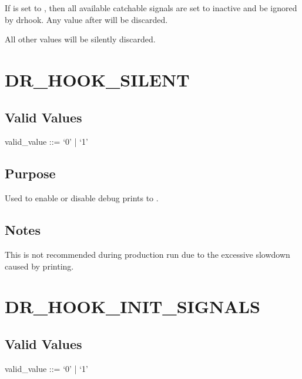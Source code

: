 \documentclass[letterpaper,10pt,english]{sphinxmanual}
\begin{document}
\sphinxAtStartPar
If  is set to , then all available catchable signals are set to inactive and be ignored by drhook. Any value after  will be discarded.

\sphinxAtStartPar
All other values will be silently discarded.


\section{DR\_HOOK\_SILENT}
\label{\detokenize{flag/flag:dr-hook-silent}}\label{\detokenize{flag/flag:id23}}

\subsection{Valid Values}
\label{\detokenize{flag/flag:id24}}
\begin{DUlineblock}{0em}
\item[] valid\_value ::= ‘0’ | ‘1’
\end{DUlineblock}


\subsection{Purpose}
\label{\detokenize{flag/flag:id25}}
\sphinxAtStartPar
Used to enable or disable debug prints to .


\subsection{Notes}
\label{\detokenize{flag/flag:id26}}
\sphinxAtStartPar
This is not recommended during production run due to the excessive slowdown caused by printing.


\section{DR\_HOOK\_INIT\_SIGNALS}
\label{\detokenize{flag/flag:dr-hook-init-signals}}\label{\detokenize{flag/flag:id28}}

\subsection{Valid Values}
\label{\detokenize{flag/flag:id29}}
\begin{DUlineblock}{0em}
\item[] valid\_value ::= ‘0’ | ‘1’
\end{DUlineblock}
\end{document}

